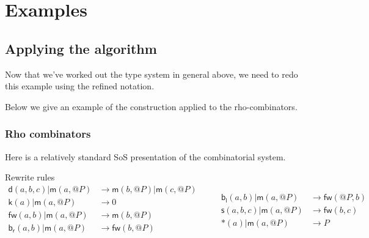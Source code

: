 \documentclass{llncs}
\makeatletter
\renewcommand{\:}{\colon}
\newcommand{\bc}{\mathbin{\mathbf{::=}}}
\newcommand{\bm}{\mathbin{\mathbf\mid}}
\newcommand{\quotep}[1]{\mathsf{@}#1}
\newcommand{\red}{\rightarrow}
\newcommand{\scong}{\mathbin{\equiv}}
\makeatother
\begin{document}
\section{Examples}
\subsection{Applying the algorithm}
Now that we’ve worked out the type system in general above, we need to redo this example using the refined notation.

Below we give an example of the construction applied to the rho-combinators.
\subsubsection{Rho combinators}
Here is a relatively standard SoS presentation of the combinatorial system. 


Rewrite rules
\[\begin{array}{rl}
\mathsf{d}(a,b,c) | \mathsf{m}(a,\quotep{P}) & \red \mathsf{m}(b,\quotep{P}) | \mathsf{m}(c,\quotep{P}) \\
\mathsf{k}(a) | \mathsf{m}(a,\quotep{P}) & \red 0 \\
\mathsf{fw}(a,b) | \mathsf{m}(a,\quotep{P}) & \red \mathsf{m}(b,\quotep{P}) \\
\mathsf{b}_{\mathsf{r}}(a,b) | \mathsf{m}(a,\quotep{P}) & \red \mathsf{fw}(b,\quotep{P}) \\  
\end{array} \quad \quad
\begin{array}{rl}
  \mathsf{b}_{\mathsf{l}}(a,b) | \mathsf{m}(a,\quotep{P}) & \red \mathsf{fw}(\quotep{P},b) \\
  \mathsf{s}(a,b,c) | \mathsf{m}(a,\quotep{P}) & \red \mathsf{fw}(b,c) \\
  *(a) | \mathsf{m}(a,\quotep{P}) & \red P
\end{array}\]
\end{document}
